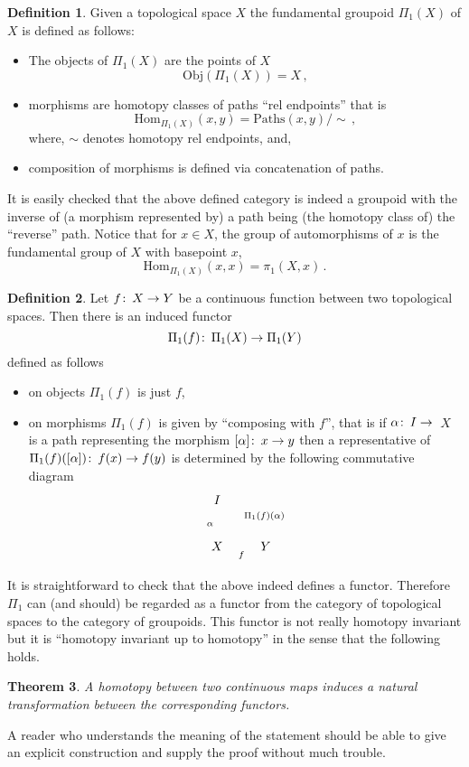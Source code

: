 \documentclass[12pt]{article}
\newtheorem{thm}{Theorem}
\theoremstyle{definition}
\newtheorem{defn}[thm]{Definition}
\theoremstyle{remark}
\numberwithin{equation}{subsection}
\def\co{\colon\thinspace}
\begin{document}
\begin{defn} Given a topological space $X$ the fundamental groupoid
 $\Pi_1(X)$ of $X$ is defined as
follows:
\begin{itemize}
\item The objects of $\Pi_1(X)$ are the points of $X$
$$\mathrm{Obj}(\Pi_1(X))=X\,,$$
\item morphisms are homotopy classes of paths ``rel endpoints'' that is
$$\mathrm{Hom}_{\Pi_1(X)}(x,y)=\mathrm{Paths}(x,y)/\sim\,,$$
where, $\sim$ denotes homotopy rel endpoints, and,
\item composition of morphisms is defined via concatenation of paths.
\end{itemize}
\end{defn}

It is easily checked that the above defined category is indeed a groupoid
with the inverse of (a morphism represented by) a path being (the homotopy
class of) the ``reverse'' path.
Notice that for $x \in X$, the group of automorphisms of $x$ is the
fundamental group of $X$ with basepoint $x$,
$$\mathrm{Hom}_{\Pi_1(X)}(x,x)=\pi_1(X,x)\,.$$

\begin{defn}
  Let $f\co X\to Y$ be a continuous function between two topological spaces.
Then there is an induced functor 
$$\Pi_1(f)\co \Pi_1(X)\to\Pi_1(Y)$$
defined as follows
\begin{itemize}
\item on objects $\Pi_1(f)$ is just $f$,
\item on morphisms $\Pi_1(f)$ is given by ``composing with $f$'', that is 
if $\alpha\co I\to$~$ X$ is a path representing the morphism 
$[\alpha]\co x\to y$ then a representative of
 $\Pi_1(f)([\alpha])\co f(x)\to f(y)$
is determined by the following commutative diagram 
 $$\xymatrix{{I}\ar[d]_{\alpha}\ar@{-->}[dr]^{\Pi_1(f)(\alpha)}\\
 {X}\ar[r]_f&{Y} }$$
\end{itemize}
\end{defn}

It is straightforward to check that the above indeed defines a
functor. Therefore $\Pi_1$ can (and should) be regarded as a functor from
the category of topological spaces to the category of groupoids. This functor 
is not really homotopy invariant but it is ``homotopy invariant up to
homotopy'' in the sense that the following holds.
\begin{thm}
  A homotopy between two continuous maps induces a natural transformation
  between the corresponding functors.
\end{thm}

A reader who understands the meaning of the statement should be able to give 
an explicit construction and supply the proof without much trouble.
\end{document}
